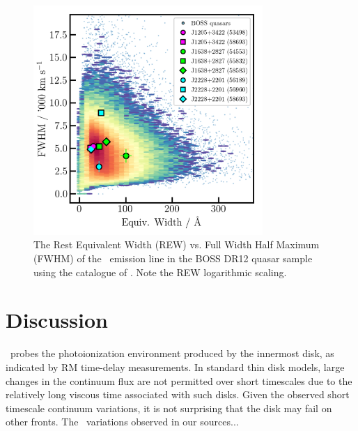 \documentclass[a4paper,fleqn,usenatbib]{mnras}
\begin{document}
\begin{figure}
  \centering
  \includegraphics[width=8.7cm, trim=0.2cm 0.2cm 0.2cm 0.2cm, clip]
  {figures/CIV_CLQs_REWvsFWHM_20191029.png}
   \vspace{-12pt}
  \caption[]{The Rest Equivalent Width (REW) vs. Full Width Half Maximum (FWHM) 
of the \civ\ emission line in the BOSS DR12 quasar sample using the catalogue 
of \citet{Hamann2017}. Note the REW logarithmic scaling.}
  \label{fig:REWvsFWHM}
\end{figure}

\section{Discussion}
\civ\ probes the photoionization environment produced by the innermost
disk, as indicated by RM time-delay measurements. In standard \citet{SS73}
thin disk models, large changes in the continuum flux are not
permitted over short timescales due to the relatively long viscous
time associated with such disks. Given the observed short timescale
continuum variations, it is not surprising that the \citet{SS73} disk may fail
on other fronts. The \civ\ variations observed in our sources... 
\end{document}

